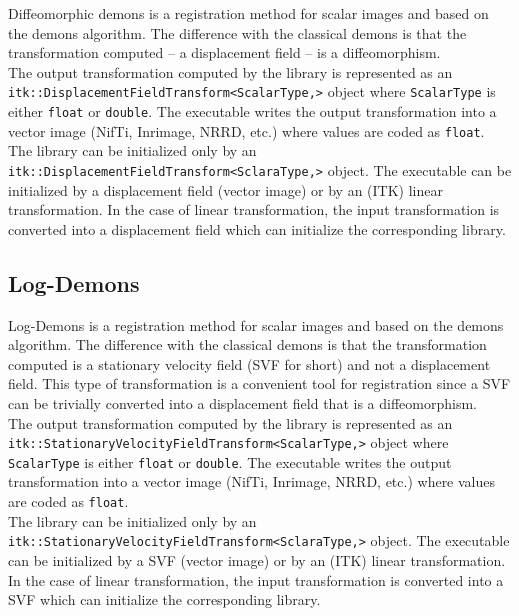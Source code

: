 Diffeomorphic demons is a registration method for scalar images and based on the demons algorithm. The difference with the classical demons is that the transformation computed -- a displacement field -- is a diffeomorphism.
\\
The output transformation computed by the library is represented as an \texttt{itk::\-Displacement\-Field\-Transform\-<ScalarType,>} object where \texttt{ScalarType} is either \texttt{float} or \texttt{double}. The executable writes the output transformation into a vector image (NifTi, Inrimage, NRRD, etc.) where values are coded as \texttt{float}.
\\
The library can be initialized only by an \texttt{itk::\-Displacement\-Field\-Transform\-<SclaraType,>} object. The executable can be initialized by a displacement field (vector image) or by an (ITK) linear transformation. In the case of linear transformation, the input transformation is converted into a displacement field which can initialize the corresponding library.



\subsection{Log-Demons}

Log-Demons is a registration method for scalar images and based on the demons algorithm. The difference with the classical demons is that the transformation computed is a stationary velocity field (SVF for short) and not a displacement field. This type of transformation is a convenient tool for registration since a SVF can be trivially converted into a displacement field that is a diffeomorphism.
\\
The output transformation computed by the library is represented as an \texttt{itk::\-Stationary\-Velocity\-Field\-Transform\-<ScalarType,>} object where \texttt{ScalarType} is either \texttt{float} or \texttt{double}. The executable writes the output transformation into a vector image (NifTi, Inrimage, NRRD, etc.) where values are coded as \texttt{float}.
\\
The library can be initialized only by an \texttt{itk::\-Stationary\-Velocity\-Field\-Transform\-<SclaraType,>} object. The executable can be initialized by a SVF (vector image) or by an (ITK) linear transformation. In the case of linear transformation, the input transformation is converted into a SVF which can initialize the corresponding library.



